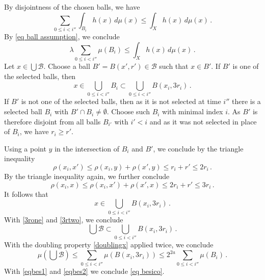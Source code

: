 By  disjointness of the chosen balls, we have
\begin{equation}
\sum_{0\le i<i''}\int_{B_i} h(x)\, d\mu(x) \le \int_X  h(x)\, d\mu(x)\, .
\end{equation}
By \eqref{eq ball assumption}, we conclude
\begin{equation}\label{eqbes1}
\lambda \sum_{0\le i<i''}\mu(B_i)
\le  \int_X  h(x)\, d\mu(x)\, .
\end{equation}
Let $x\in \bigcup \mathcal{B}$.
Choose a ball $B'=B(x',r')\in \mathcal{B}$
such that $x\in B'$.
If $B'$ is one of the selected balls, then
\begin{equation}\label{3rone}
    x\in \bigcup _{0\le i< i''}B_i\subset \bigcup _{0\le i< i''}B(x_i,3r_i)\, .
\end{equation}
If $B'$ is not one of the selected balls, then as it is not selected at time $i''$ there is a selected ball $B_i$  with
$B'\cap B_i\neq \emptyset$.
Choose such $B_i$ with minimal index $i$. As $B'$ is therefore disjoint from all
balls $B_{i'}$ with $i'<i$ and
as it was not selected in place of $B_i$, we have $r_i\ge r'$.

Using a point $y$ in the intersection of $B_i$ and $B'$,
we conclude by the triangle inequality
\begin{equation}
    \rho(x_i,x')\le \rho(x_i,y)+\rho(x',y)\le r_i+r'\le 2r_i \, .
\end{equation}
By the triangle inequality again, we further conclude
\begin{equation}
    \rho(x_i,x)\le \rho(x_i,x')+\rho(x',x)\le 2r_i+r'\le 3r_i \, .
\end{equation}
It follows that
\begin{equation}\label{3rtwo}
    x\in  \bigcup _{0\le i< i''}B(x_i,3r_i)\, .
\end{equation}
With \eqref{3rone} and \eqref{3rtwo}, we conclude
\begin{equation}
\bigcup \mathcal{B}\subset
\bigcup _{0\le i< i''}B(x_i,3r_i)\, .
\end{equation}
With the doubling property
\eqref{doublingx} applied twice, we conclude
\begin{equation}\label{eqbes2}
    \mu(\bigcup{\mathcal{B}})
    \le \sum _{0\le i< i''}\mu (B(x_i,3r_i))
    \le 2^{2a}\sum _{0\le i< i''}\mu (B_i)\, .
\end{equation}
With \eqref{eqbes1} and \eqref{eqbes2} we conclude
\eqref{eq besico}.


